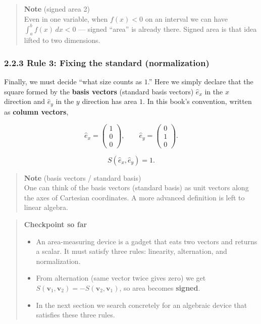 \documentclass[a4paper,12pt,openany]{book}
\begin{document}
\begin{quote}
\textbf{Note} (signed area 2)\\
Even in one variable, when \(f(x)<0\) on an interval we can have
\(\displaystyle\int_a^b f(x)\,dx<0\) — signed ``area'' is already
there. Signed area is that idea lifted to two dimensions.
\end{quote}

\hypertarget{rule-3-fixing-the-standard-normalization}{%
\subsubsection{2.2.3 Rule 3: Fixing the standard
(normalization)}\label{rule-3-fixing-the-standard-normalization}}

Finally, we must decide ``what size counts as \(1\).'' Here we simply
declare that the square formed by the \textbf{basis vectors} (standard
basis vectors) \(\hat{e}_x\) in the \(x\) direction and \(\hat{e}_y\) in
the \(y\) direction has area \(1\). In this book's convention, written
as \textbf{column vectors},

\[\hat{e}_x=\begin{pmatrix}1\\0\\0\end{pmatrix},\qquad
\hat{e}_y=\begin{pmatrix}0\\1\\0\end{pmatrix}.\]

\[S(\hat{e}_x,\hat{e}_y)=1.\]

\begin{quote}
\textbf{Note} (basis vectors / standard basis)\\
One can think of the basis vectors (standard basis) as unit vectors
along the axes of Cartesian coordinates. A more advanced definition is
left to linear algebra.
\end{quote}

\par\vspace{0.35em}\par

\begin{quote}
\textbf{Checkpoint so far}

\begin{itemize}
\item
  An area-measuring device is a gadget that eats two vectors and returns
  a scalar. It must satisfy three rules: linearity, alternation, and
  normalization.
\item
  From alternation (same vector twice gives zero) we get
  \(S(\mathbf{v}_1,\mathbf{v}_2)=-S(\mathbf{v}_2,\mathbf{v}_1)\), so
  area becomes \textbf{signed}.
\item
  In the next section we search concretely for an algebraic device that
  satisfies these three rules.
\end{itemize}
\end{quote}
\end{document}
